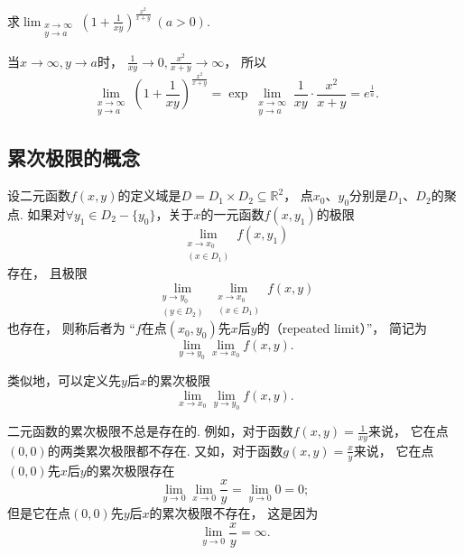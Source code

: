 \begin{example}
求\(\lim_{\substack{x\to\infty \\ y \to a}} \left( 1 + \frac1{x y} \right)^{\frac{x^2}{x+y}}\ (a>0)\).
\begin{solution}
当\(x\to\infty,y \to a\)时，
\(\frac1{xy} \to 0,
\frac{x^2}{x+y} \to \infty\)，
所以\begin{equation*}
	\lim_{\substack{x\to\infty \\ y \to a}} \left( 1 + \frac1{x y} \right)^{\frac{x^2}{x+y}}
	= \exp\lim_{\substack{x\to\infty \\ y \to a}} \frac1{x y} \cdot \frac{x^2}{x+y}
	= e^{\frac1a}.
\end{equation*}
\end{solution}
\end{example}

\subsection{累次极限的概念}
\begin{definition}
设二元函数\(f(x,y)\)的定义域是\(D = D_1 \times D_2 \subseteq \mathbb{R}^2\)，
点\(x_0\)、\(y_0\)分别是\(D_1\)、\(D_2\)的聚点.
如果对\(\forall y_1 \in D_2 - \{y_0\}\)，关于\(x\)的一元函数\(f(x,y_1)\)的极限\[
	\lim_{\substack{x \to x_0 \\ (x \in D_1)}} f(x,y_1)
\]存在，
且极限\[
	\lim_{\substack{y \to y_0 \\ (y \in D_2)}}
	\lim_{\substack{x \to x_0 \\ (x \in D_1)}} f(x,y)
\]也存在，
则称后者为
“\(f\)在点\((x_0,y_0)\)先\(x\)后\(y\)的（repeated limit）”，
简记为\[
	\lim_{y \to y_0} \lim_{x \to x_0} f(x,y).
\]

类似地，可以定义先\(y\)后\(x\)的累次极限\[
	\lim_{x \to x_0} \lim_{y \to y_0} f(x,y).
\]
\end{definition}

二元函数的累次极限不总是存在的.
例如，对于函数\(f(x,y)=\frac1{xy}\)来说，
它在点\((0,0)\)的两类累次极限都不存在.
又如，对于函数\(g(x,y)=\frac{x}{y}\)来说，
它在点\((0,0)\)先\(x\)后\(y\)的累次极限存在\[
	\lim_{y\to0}\lim_{x\to0}\frac{x}{y}
	=\lim_{y\to0}0
	=0;
\]
但是它在点\((0,0)\)先\(y\)后\(x\)的累次极限不存在，
这是因为\[
	\lim_{y\to0}\frac{x}{y}=\infty.
\]

